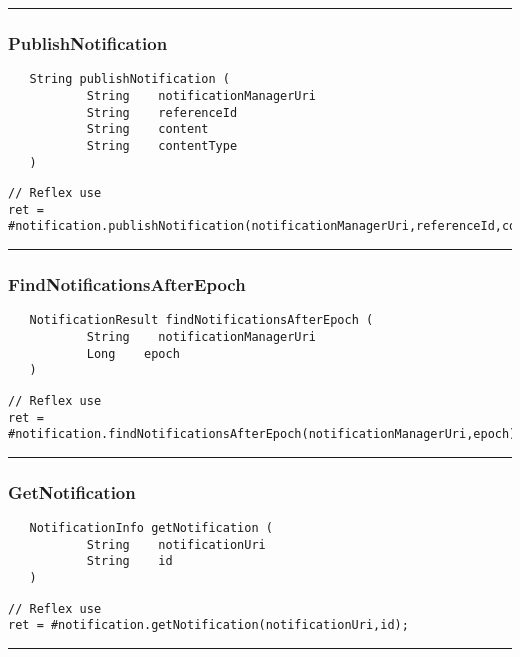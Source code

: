 \rule{15cm}{2pt}
\subsubsection{PublishNotification}
\label{Api:PublishNotification}
\begin{verbatim}
   String publishNotification (
           String    notificationManagerUri
           String    referenceId
           String    content
           String    contentType
   )
\end{verbatim}
\begin{lstlisting}[language=reflex]
// Reflex use
ret = #notification.publishNotification(notificationManagerUri,referenceId,content,contentType);
\end{lstlisting}



\rule{15cm}{2pt}
\subsubsection{FindNotificationsAfterEpoch}
\label{Api:FindNotificationsAfterEpoch}
\begin{verbatim}
   NotificationResult findNotificationsAfterEpoch (
           String    notificationManagerUri
           Long    epoch
   )
\end{verbatim}
\begin{lstlisting}[language=reflex]
// Reflex use
ret = #notification.findNotificationsAfterEpoch(notificationManagerUri,epoch);
\end{lstlisting}



\rule{15cm}{2pt}
\subsubsection{GetNotification}
\label{Api:GetNotification}
\begin{verbatim}
   NotificationInfo getNotification (
           String    notificationUri
           String    id
   )
\end{verbatim}
\begin{lstlisting}[language=reflex]
// Reflex use
ret = #notification.getNotification(notificationUri,id);
\end{lstlisting}



\rule{15cm}{2pt}

